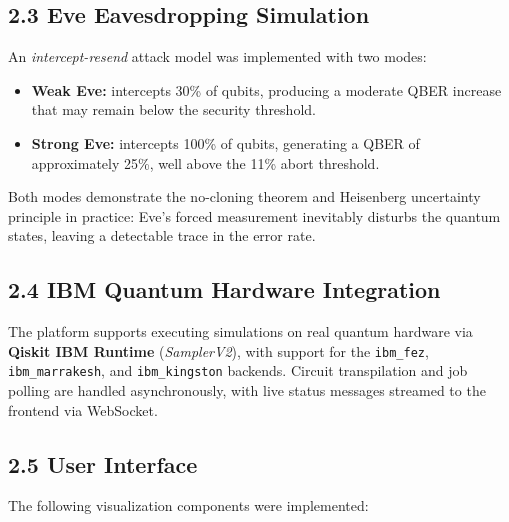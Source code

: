 \documentclass[12pt, a4paper]{article}
\begin{document}
\subsection{2.3 Eve Eavesdropping Simulation}

An \textit{intercept-resend} attack model was implemented with two modes:

\begin{itemize}
  \item \textbf{Weak Eve:} intercepts 30\% of qubits, producing a moderate
        QBER increase that may remain below the security threshold.
  \item \textbf{Strong Eve:} intercepts 100\% of qubits, generating a QBER
        of approximately 25\%, well above the 11\% abort threshold.
\end{itemize}

Both modes demonstrate the no-cloning theorem and Heisenberg uncertainty
principle in practice: Eve's forced measurement inevitably disturbs the
quantum states, leaving a detectable trace in the error rate.

\subsection{2.4 IBM Quantum Hardware Integration}

The platform supports executing simulations on real quantum hardware via
\textbf{Qiskit IBM Runtime} (\textit{SamplerV2}), with support for the
\texttt{ibm\_fez}, \texttt{ibm\_marrakesh}, and \texttt{ibm\_kingston}
backends. Circuit transpilation and job polling are handled asynchronously,
with live status messages streamed to the frontend via WebSocket.

\subsection{2.5 User Interface}

The following visualization components were implemented:
\end{document}
